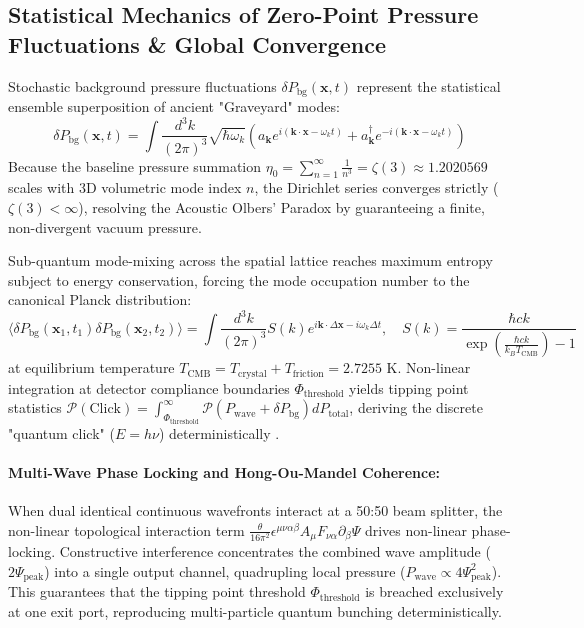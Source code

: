 \documentclass[11pt,a4paper]{article}
\begin{document}
	\subsection{Statistical Mechanics of Zero-Point Pressure Fluctuations \& Global Convergence}
	Stochastic background pressure fluctuations $\delta P_{\text{bg}}(\mathbf{x}, t)$ represent the statistical ensemble superposition of ancient "Graveyard" modes:
	\begin{equation}
		\delta P_{\text{bg}}(\mathbf{x}, t) = \int \frac{d^3k}{(2\pi)^3} \sqrt{\hbar \omega_k} \left( a_{\mathbf{k}} e^{i(\mathbf{k} \cdot \mathbf{x} - \omega_k t)} + a_{\mathbf{k}}^\dagger e^{-i(\mathbf{k} \cdot \mathbf{x} - \omega_k t)} \right)
	\end{equation}
	Because the baseline pressure summation $\eta_0 = \sum_{n=1}^\infty \frac{1}{n^3} = \zeta(3) \approx 1.2020569$ scales with 3D volumetric mode index $n$, the Dirichlet series converges strictly ($\zeta(3) < \infty$), resolving the Acoustic Olbers' Paradox by guaranteeing a finite, non-divergent vacuum pressure.
	
	Sub-quantum mode-mixing across the spatial lattice reaches maximum entropy subject to energy conservation, forcing the mode occupation number to the canonical Planck distribution:
	\begin{equation}
		\langle \delta P_{\text{bg}}(\mathbf{x}_1, t_1) \delta P_{\text{bg}}(\mathbf{x}_2, t_2) \rangle = \int \frac{d^3k}{(2\pi)^3} S(k) e^{i \mathbf{k} \cdot \Delta\mathbf{x} - i \omega_k \Delta t}, \quad S(k) = \frac{\hbar c k}{\exp\left(\frac{\hbar c k}{k_B T_{\text{CMB}}}\right) - 1}
	\end{equation}
	at equilibrium temperature $T_{\text{CMB}} = T_{\text{crystal}} + T_{\text{friction}} = 2.7255\text{ K}$. Non-linear integration at detector compliance boundaries $\Phi_{\text{threshold}}$ yields tipping point statistics $\mathcal{P}(\text{Click}) = \int_{\Phi_{\text{threshold}}}^\infty \mathcal{P}(P_{\text{wave}} + \delta P_{\text{bg}}) d P_{\text{total}}$, deriving the discrete "quantum click" ($E=h\nu$) deterministically \cite{kulangiev2025}.
	
	\paragraph{Multi-Wave Phase Locking and Hong-Ou-Mandel Coherence:}
	When dual identical continuous wavefronts interact at a 50:50 beam splitter, the non-linear topological interaction term $\frac{\theta}{16\pi^2} \epsilon^{\mu\nu\alpha\beta} A_\mu F_{\nu\alpha} \partial_\beta \Psi$ drives non-linear phase-locking. Constructive interference concentrates the combined wave amplitude ($2\Psi_{\text{peak}}$) into a single output channel, quadrupling local pressure ($P_{\text{wave}} \propto 4\Psi_{\text{peak}}^2$). This guarantees that the tipping point threshold $\Phi_{\text{threshold}}$ is breached exclusively at one exit port, reproducing multi-particle quantum bunching deterministically.
	
\end{document}
